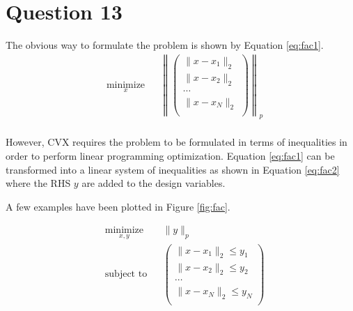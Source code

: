 \documentclass[letterpaper,12pt,]{article}
\begin{document}
\section*{Question 13}

The obvious way to formulate the problem is shown by Equation \ref{eq:fac1}. 
\begin{equation}
\begin{aligned}
& \underset{x}{\text{minimize}}
& &\left\lVert{
      \begin{pmatrix}
      \|x-x_1\|_2 \\
      \|x-x_2\|_2 \\
      \cdots      \\
      \|x-x_N\|_2 \\
      \end{pmatrix}
    }\right\rVert_p\\
\end{aligned}
\label{eq:fac1}
\end{equation}

However, CVX requires the problem to be formulated in terms of inequalities in order to perform linear programming optimization. Equation \ref{eq:fac1} can be transformed into a linear system of inequalities as shown in Equation \ref{eq:fac2} where the RHS $y$ are added to the design variables.

A few examples have been plotted in Figure \ref{fig:fac}.

\begin{equation}
\begin{aligned}
& \underset{x,y}{\text{minimize}}
& &\|y\|_p \\
& \text{subject to}
& &\begin{pmatrix}
      \|x-x_1\|_2 \leq y_1 \\
      \|x-x_2\|_2 \leq y_2 \\
      \cdots               \\
      \|x-x_N\|_2 \leq y_N \\
   \end{pmatrix}\\
\end{aligned}
\label{eq:fac2}
\end{equation}
\end{document}
